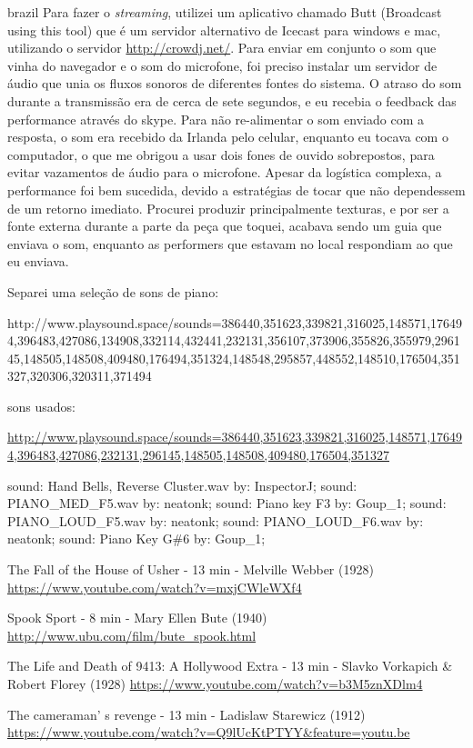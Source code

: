 \begin{otherlanguage*}{brazil}
Para fazer o \emph{streaming}, utilizei um aplicativo chamado Butt (Broadcast using this tool) que é um servidor alternativo de Icecast para windows e mac, utilizando o servidor \url{http://crowdj.net/}. Para enviar em conjunto o som que vinha do navegador e o som do microfone, foi preciso instalar um servidor de áudio que unia os fluxos sonoros de diferentes fontes do sistema. O atraso do som durante a transmissão era de cerca de sete segundos, e eu recebia o feedback das performance através do skype. Para não re-alimentar o som enviado com a resposta, o som era recebido da Irlanda pelo celular, enquanto eu tocava com o computador, o que me obrigou a usar dois fones de ouvido sobrepostos, para evitar vazamentos de áudio para o microfone. Apesar da logística complexa, a performance foi bem sucedida, devido a estratégias de tocar que não dependessem de um retorno imediato. Procurei produzir principalmente texturas, e por ser a fonte externa durante a parte da peça que toquei, acabava sendo um guia que enviava o som, enquanto as performers que estavam no local respondiam ao que eu enviava. 


Separei uma seleção de sons de piano: 


http://www.playsound.space/sounds=386440,351623,339821,316025,148571,176494,396483,427086,134908,332114,432441,232131,356107,373906,355826,355979,296145,148505,148508,409480,176494,351324,148548,295857,448552,148510,176504,351327,320306,320311,371494

sons usados:

\url{http://www.playsound.space/sounds=386440,351623,339821,316025,148571,176494,396483,427086,232131,296145,148505,148508,409480,176504,351327}

sound: Hand Bells, Reverse Cluster.wav by: InspectorJ; sound: PIANO\_MED\_F5.wav by: neatonk; sound: Piano key F3 by: Goup\_1; sound: PIANO\_LOUD\_F5.wav by: neatonk; sound: PIANO\_LOUD\_F6.wav by: neatonk; sound: Piano Key G\#6 by: Goup\_1;




\end{otherlanguage*}




The Fall of the House of Usher  - 13 min - Melville Webber (1928)
\url{https://www.youtube.com/watch?v=mxjCWleWXf4}

Spook Sport - 8 min - Mary Ellen Bute (1940)
\url{http://www.ubu.com/film/bute_spook.html}

The Life and Death of 9413: A Hollywood Extra - 13  min - Slavko Vorkapich \& Robert Florey (1928)
\url{https://www.youtube.com/watch?v=b3M5znXDlm4}

The cameraman' s revenge  - 13 min - Ladislaw Starewicz (1912)
\url{https://www.youtube.com/watch?v=Q9lUcKtPTYY&feature=youtu.be}











